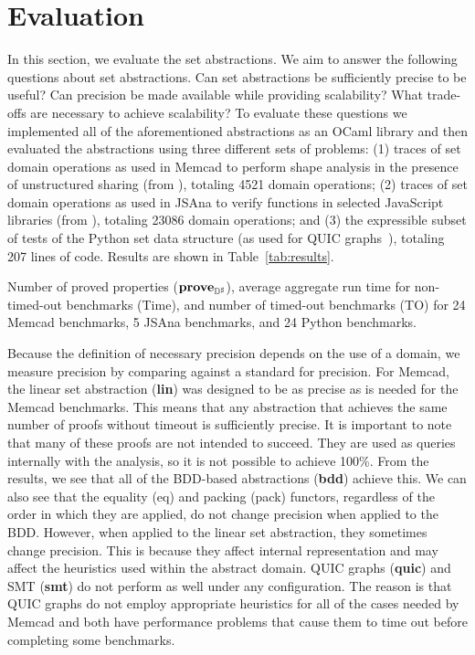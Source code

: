 \section{Evaluation}
\label{sec:evaluation}

In this section, we evaluate the set abstractions.  We aim to answer the following questions about set abstractions. Can set abstractions be sufficiently precise to be useful? Can precision be made available while providing scalability? What trade-offs are necessary to achieve scalability?  To evaluate these questions we implemented all of the aforementioned abstractions as an OCaml library and then evaluated the abstractions using three different sets of problems: (1) traces of set domain operations as used in Memcad to perform shape analysis in the presence of unstructured sharing (from \cite{memcad:15:sas}), totaling 4521 domain operations; (2) traces of set domain operations as used in JSAna to verify functions in selected JavaScript libraries (from \cite{hoo:14:sas,desync:15:esop}), totaling 23086 domain operations; and (3) the expressible subset of tests of the Python set data structure (as used for QUIC graphs~\cite{ab:ecoop:13}), totaling 207 lines of code.  Results are shown in Table~\ref{tab:results}.

\begin{table}[t]
    \caption{Number of proved properties ($\textbf{prove}_{{\mathbb{D}}^{\sharp}}$), average aggregate run time for non-timed-out benchmarks (Time), and number of timed-out benchmarks (TO) for 24 Memcad benchmarks, 5 JSAna benchmarks, and 24 Python benchmarks.}
    \label{tab:results}
    
\end{table}

Because the definition of necessary precision depends on the use of a domain, we measure precision by comparing against a standard for precision.  For Memcad, the linear set abstraction (\textbf{lin}) was designed to be as precise as is needed for the Memcad benchmarks.  This means that any abstraction that achieves the same number of proofs without timeout is sufficiently precise.  It is important to note that many of these proofs are not intended to succeed.  They are used as queries internally with the analysis, so it is not possible to achieve 100\%.  From the results, we see that all of the BDD-based abstractions (\textbf{bdd}) achieve this.  We can also see that the equality (eq) and packing (pack) functors, regardless of the order in which they are applied, do not change precision when applied to the BDD.  However, when applied to the linear set abstraction, they sometimes change precision.  This is because they affect internal representation and may affect the heuristics used within the abstract domain.  QUIC graphs (\textbf{quic}) and SMT (\textbf{smt}) do not perform as well under any configuration.  The reason is that QUIC graphs do not employ appropriate heuristics for all of the cases needed by Memcad and both have performance problems that cause them to time out before completing some benchmarks.

